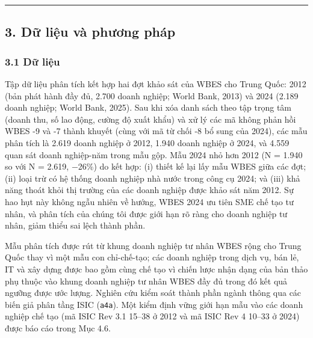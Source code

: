 \documentclass[12pt,a4paper]{article}
\begin{document}
\begin{center}\rule{0.5\linewidth}{0.5pt}\end{center}

\hypertarget{3-dux1eef-liux1ec7u-vuxe0-phux1b0ux1a1ng-phuxe1p}{%
\subsection{3. Dữ liệu và phương
pháp}\label{3-dux1eef-liux1ec7u-vuxe0-phux1b0ux1a1ng-phuxe1p}}

\hypertarget{31-dux1eef-liux1ec7u}{%
\subsubsection{3.1 Dữ liệu}\label{31-dux1eef-liux1ec7u}}

Tập dữ liệu phân tích kết hợp hai đợt khảo sát của WBES cho Trung Quốc:
2012 (bản phát hành đầy đủ, 2.700 doanh nghiệp; World Bank, 2013) và
2024 (2.189 doanh nghiệp; World Bank, 2025). Sau khi xóa danh sách theo
tập trọng tâm (doanh thu, số lao động, cường độ xuất khẩu) và xử lý các
mã không phản hồi WBES -9 và -7 thành khuyết (cùng với mã từ chối -8 bổ
sung của 2024), các mẫu phân tích là 2.619 doanh nghiệp ở 2012, 1.940
doanh nghiệp ở 2024, và 4.559 quan sát doanh nghiệp-năm trong mẫu gộp.
Mẫu 2024 nhỏ hơn 2012 (N = 1.940 so với N = 2.619, −26\%) do kết hợp:
(i) thiết kế lại lấy mẫu WBES giữa các đợt; (ii) loại trừ có hệ thống
doanh nghiệp nhà nước trong công cụ 2024; và (iii) khả năng thoát khỏi
thị trường của các doanh nghiệp được khảo sát năm 2012. Sự hao hụt này
không ngẫu nhiên về hướng, WBES 2024 ưu tiên SME chế tạo tư nhân, và
phân tích của chúng tôi được giới hạn rõ ràng cho doanh nghiệp tư nhân,
giảm thiểu sai lệch thành phần.

Mẫu phân tích được rút từ khung doanh nghiệp tư nhân WBES rộng cho Trung
Quốc thay vì một mẫu con chỉ-chế-tạo; các doanh nghiệp trong dịch vụ,
bán lẻ, IT và xây dựng được bao gồm cùng chế tạo vì chiến lược nhận dạng
của bản thảo phụ thuộc vào khung doanh nghiệp tư nhân WBES đầy đủ trong
đó kết quả ngưỡng được ước lượng. Nghiên cứu kiểm soát thành phần ngành
thông qua các biến giả phân tầng ISIC (\texttt{a4a}). Một kiểm định vững
giới hạn mẫu vào các doanh nghiệp chế tạo (mã ISIC Rev 3.1 15--38 ở 2012
và mã ISIC Rev 4 10--33 ở 2024) được báo cáo trong Mục 4.6.
\end{document}
